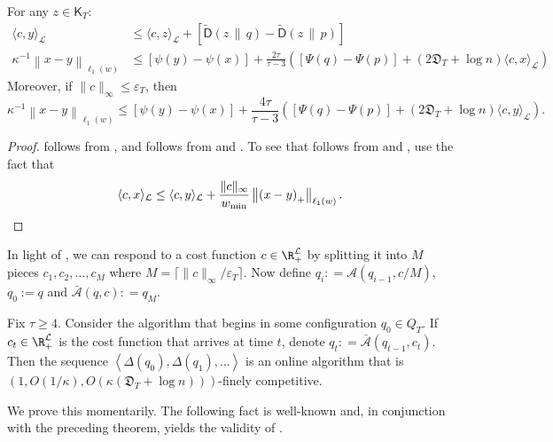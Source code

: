\documentclass{toc}
\newcommand{\calA}{\mathcal A}
\newcommand{\calL}{\mathcal L}
\newcommand{\dmid}{\,\|\,}
\newcommand{\eps}{\varepsilon}
\newcommand{\depth}{\mathfrak{D}}
\newcommand{\seteq}{\mathrel{\mathop:}=}
\newcommand{\sfD}{\mathsf D}
\newcommand{\sfK}{\mathsf K}
\newcommand{\tilD}{\tilde{\sfD}}
\newcommand{\llangle}{\left\langle}
\newcommand{\rrangle}{\right\rangle}
\begin{document}
\begin{theorem}\label{thm:analysis}
	For any $z \in \sfK_T$:
	\begin{align}
	\langle c, y\rangle_{\calL} &\leq \langle c,z\rangle_{\calL} + \left[\tilD(z \dmid q) - \tilD(z \dmid p)\right] \label{eq:sc} \\
	\kappa^{-1} \left\|x-y\right\|_{\ell_1(w)} &\leq [\psi(y)-\psi(x)] + \frac{2 \tau}{\tau-3} \left([\Psi(q)-\Psi(p)] + (2\depth_T + \log n) \langle c, x\rangle_{\calL}\right)\label{eq:mvmtx}
	\end{align}
	Moreover, if $\|c\|_{\infty} \leq \eps_T$, then
	\begin{equation}\label{eq:mvmty}
	\kappa^{-1} \left\|x-y\right\|_{\ell_1(w)} \leq [\psi(y)-\psi(x)] + \frac{4 \tau}{\tau-3} \left( [\Psi(q)-\Psi(p)] + (2\depth_T + \log n) \langle c, y\rangle_{\calL}\right).
	\end{equation}
\end{theorem}

\begin{proof}
	 follows from , and 
	follows from  and .
	To see that  follows from  and , use the fact that
	\[
	\langle c,x \rangle_{\calL} \leq \langle c,y\rangle_{\calL} + \frac{\|c\|_{\infty}}{w_{\min}} \left\|\left(x-y\right)_+\right\|_{\ell_1(w)}.\qedhere
	\]
\end{proof}

In light of , we can respond to a cost function $c \in \R_+^{\calL}$ by splitting it into $M$ pieces
$c_1,c_2,\ldots,c_M$ where $M = \lceil \|c\|_{\infty}/\eps_T\rceil$.
Now define $q_i \seteq \calA(q_{i-1}, c/M)$, $q_0:=q$ and $\bar{\calA}(q,c) \seteq q_M$.

\begin{theorem}
	\label{thm:main-technical}
	Fix $\tau \geq 4$.
	Consider the algorithm that begins in some configuration $q_0 \in Q_T$.
	If $c_t \in \R_+^{\calL}$ is the cost function that arrives at time $t$,
	denote $q_t \seteq \bar{\calA}(q_{t-1},c_t)$.  Then the sequence
	$\llangle \Delta(q_0), \Delta(q_1), \ldots\rrangle$ is an online algorithm
	that is $(1,O(1/\kappa), O(\kappa(\depth_T + \log n)))$-finely competitive.
\end{theorem}

We prove this momentarily.
The following fact is well-known and, in conjunction with the preceding theorem,
yields the validity of
%
%
 .  %
\end{document}
